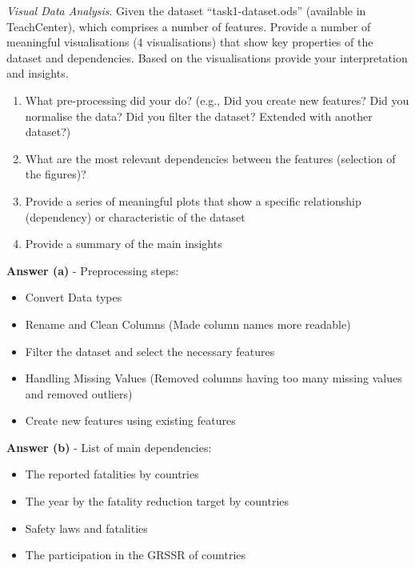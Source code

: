 \documentclass[a4paper,10pt]{article}\setlength{\textheight}{10in}\setlength{\textwidth}{6.5in}\setlength{\topmargin}{-0.125in}\setlength{\oddsidemargin}{-.2in}\setlength{\evensidemargin}{-.2in}\setlength{\headsep}{0.2in}\setlength{\footskip}{0pt}\usepackage{amsmath}\usepackage{fancyhdr}\usepackage{enumitem}\usepackage{hyperref}\usepackage{xcolor}\usepackage{graphicx}\usepackage[export]{adjustbox}\usepackage{caption}\usepackage{float}\usepackage{booktabs}\usepackage{makecell}\pagestyle{fancy}
\begin{document}
\begin{enumerate}[topsep=0mm, partopsep=0mm, leftmargin=*]





{\color{blue}
\item\textit{Visual Data Analysis}. Given the dataset ``task1-dataset.ods'' (available in TeachCenter), which comprises a number of features. Provide a number of meaningful visualisations (4 visualisations) that show key properties of the dataset and dependencies. Based on the visualisations provide your interpretation and insights. 
\begin{enumerate}
	\item What pre-processing did your do? (e.g., Did you create new features? Did you normalise the data? Did you filter the dataset? Extended with another dataset?)
	\item What are the most relevant dependencies between the features (selection of the figures)?
	\item Provide a series of meaningful plots that show a specific relationship (dependency) or characteristic of the dataset
	\item Provide a summary of the main insights
\end{enumerate}
}


\textbf{Answer (a)} - Preprocessing steps:
    \begin{itemize}
        \item Convert Data types
        \item Rename and Clean Columns (Made column names more readable)
        \item Filter the dataset and select the necessary features
        \item Handling Missing Values (Removed columns having too many missing values and removed outliers) 
        \item Create new features using existing features
        
    \end{itemize}
    
\textbf{Answer (b)} - List of main dependencies:
    \begin{itemize}
        \item The reported fatalities by countries
        \item The year by the fatality reduction target by countries
        \item Safety laws and fatalities
        \item The participation in the GRSSR of countries 
    \end{itemize}
    

\end{enumerate}
\end{document}
